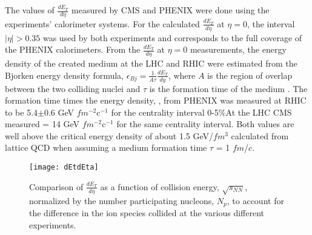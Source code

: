     The values of $\frac{dE_{T}}{d\eta}$ measured by CMS \cite{cmsEt} and PHENIX 
      \cite{phenixDeDeta} were done using the experiments' calorimeter 
      systems.
    For the calculated $\frac{dE_{T}}{d\eta}$ at $\eta = 0$, the interval 
      $|\eta| > 0.35$ was used by both experiments and corresponds to the full
      coverage of the PHENIX calorimeters. 
    From the $\frac{dE_{T}}{d\eta}$ at $\eta = 0$ measurements, the energy 
      density of the created medium at the LHC and RHIC were estimated from the
      Bjorken energy density formula, 
    $\epsilon_{Bj}=\frac{1}{A\tau}\frac{dE_{T}}{dy}$, where $A$ is the region
      of overlap between the two colliding nuclei and $\tau$ is the formation
      time of the medium \cite{bjEdense}.
    The formation time times the energy density, \DIFdelbegin {}\DIFdelend \DIFaddbegin {}\DIFaddend , 
      from PHENIX was measured at RHIC to be 5.4$\pm$0.6 GeV $fm$$^{-2}$c$^{-1}$ 
      for the centrality interval 0-5\%\DIFaddbegin {}\DIFaddend At the LHC CMS measured \DIFdelbegin {}\DIFdelend \DIFaddbegin {}\DIFaddend = 14 GeV $fm$$^{-2}$c$^{-1}$ 
      for the same centrality interval.
    Both values are well above the critical energy density of about 1.5 GeV/$fm$$^{3}$ 
      calculated from lattice QCD when assuming a medium formation time $\tau$ 
      = 1 $fm$/$c$.
      \begin{figure}[!Hhbt]
        \centering
        \texttt{[image: dEtdEta]}
        \caption{Comparison of $\frac{dE_{T}}{d\eta}$ as a function of 
          collision energy, $\sqrt{s_{NN}}$, normalized by the number 
          participating nucleons, $N_{p}$, to account for the difference in 
          the ion species collided at the various different experiments.}
        \label{fig:dEtdEta}
      \end{figure}

